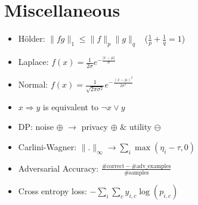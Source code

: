 \section{Miscellaneous}
\begin{itemize}
  \item Hölder: $\|fg\|_1\leq\|f\|_p\|g\|_q$ \ ($\frac{1}{p}+\frac{1}{q}=1$)
  \item Laplace: $f(x)=\frac{1}{2\sigma}e^{-\frac{|x-\mu|}{\sigma}}$
  \item Normal: $f(x)=\frac{1}{\sqrt{2\pi\sigma^2}}e^{-\frac{(x-\mu)^2}{2\sigma^2}}$
  \item $x\Rightarrow y$ is equivalent to $\neg x \lor y$
  \item DP: noise $\oplus$ $\rightarrow$ privacy $\oplus$ \& utility $\ominus$
  \item Carlini-Wagner: $\|.\|_{\infty}\rightarrow\sum_i \max(\eta_i-\tau,0)$
  \item Adversarial Accuracy: $\frac{\#\text{correct} - \#\text {adv\_examples}}{\#\text{samples}}$
  \item Cross entropy loss: $-\sum_i\sum_c y_{i,c}\log(p_{i,c})$
\end{itemize}
